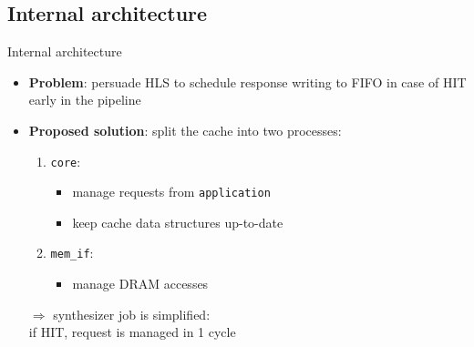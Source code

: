 \documentclass{beamer}
\begin{document}
\subsection{Internal architecture}
\begin{frame}{Internal architecture}
	\begin{minipage}{.7\textwidth}
		\begin{itemize}[<+->]
		\item \textbf{Problem}: persuade HLS to schedule response writing
			to FIFO in case of HIT early in the pipeline
		\item \textbf{Proposed solution}: split the cache into two processes:
			\begin{enumerate}[<.->]
				\item \texttt{core}:
					\begin{itemize}
						\item manage requests from \texttt{application}
						\item keep cache data structures up-to-date
					\end{itemize}
				\item \texttt{mem\_if}:
					\begin{itemize}
						\item manage DRAM accesses
					\end{itemize}
			\end{enumerate}
		$\Rightarrow$ synthesizer job is simplified:\\
		if HIT, request is managed in 1 cycle
	\end{itemize}
	\end{minipage}
	\begin{minipage}{.28\textwidth}
		\begin{center}

\end{center}
\end{minipage}
\end{frame}
\end{document}
